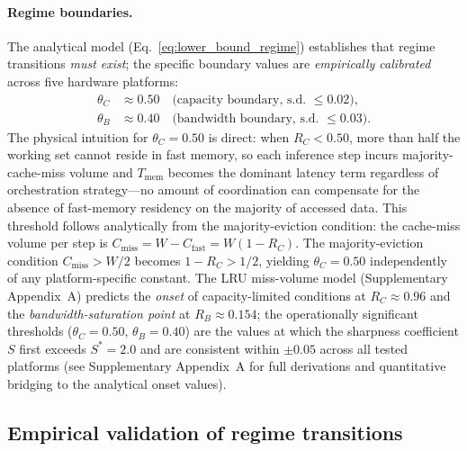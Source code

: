 \paragraph{Regime boundaries.}
The analytical model (Eq.~\ref{eq:lower_bound_regime}) establishes that regime
transitions \emph{must exist}; the specific boundary values are
\emph{empirically calibrated} across five hardware platforms:
\begin{align}
\theta_C &\approx 0.50 \quad \text{(capacity boundary, s.d.\ $\leq 0.02$)},\label{eq:theta_C}\\
\theta_B &\approx 0.40 \quad \text{(bandwidth boundary, s.d.\ $\leq 0.03$)}.\label{eq:theta_B}
\end{align}
The physical intuition for $\theta_C = 0.50$ is direct: when $R_C < 0.50$,
more than half the working set cannot reside in fast memory, so each inference
step incurs majority-cache-miss volume and $T_{\mathrm{mem}}$ becomes the
dominant latency term regardless of orchestration strategy---no amount of
coordination can compensate for the absence of fast-memory residency on the
majority of accessed data.
This threshold follows analytically from the majority-eviction condition:
the cache-miss volume per step is
$C_{\mathrm{miss}} = W - C_{\mathrm{fast}} = W(1 - R_C)$.
The majority-eviction condition $C_{\mathrm{miss}} > W/2$ becomes
$1 - R_C > 1/2$, yielding $\theta_C = 0.50$ independently of any
platform-specific constant.
The LRU miss-volume model (Supplementary Appendix~A) predicts the
\emph{onset} of capacity-limited conditions at $R_C \approx 0.96$ and
the \emph{bandwidth-saturation point} at $R_B \approx 0.154$;
the operationally significant thresholds ($\theta_C = 0.50$,
$\theta_B = 0.40$) are the values at which the sharpness coefficient $S$
first exceeds $S^* = 2.0$ and are consistent within $\pm 0.05$ across
all tested platforms (see Supplementary Appendix~A for full derivations
and quantitative bridging to the analytical onset values).


\subsection{Empirical validation of regime transitions}
\label{sec:experiments}

